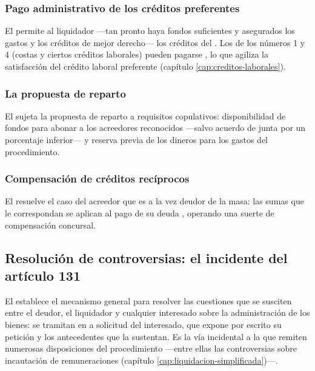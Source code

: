 \subsubsection{Pago administrativo de los créditos preferentes}

El  permite al liquidador  ---tan pronto haya
fondos suficientes y asegurados los gastos y los créditos de mejor derecho--- los créditos del
. Los de los números 1 y 4 (costas y ciertos créditos laborales) pueden pagarse
, lo que agiliza la satisfacción del crédito laboral
preferente (capítulo \ref{cap:creditos-laborales}).

\subsubsection{La propuesta de reparto}

El  sujeta la propuesta de reparto a requisitos copulativos: disponibilidad de fondos
para abonar a los acreedores reconocidos  ---salvo
acuerdo de junta por un porcentaje inferior--- y reserva previa de los dineros para los gastos
del procedimiento.

\subsubsection{Compensación de créditos recíprocos}

El  resuelve el caso del acreedor que es a la vez deudor de la masa: las sumas que le
correspondan se aplican al pago de su deuda , operando una
suerte de compensación concursal.

\subsection{Resolución de controversias: el incidente del artículo 131}

El  establece el mecanismo general para resolver las cuestiones que se susciten entre el
deudor, el liquidador y cualquier interesado sobre la administración de los bienes: se tramitan
en  a solicitud del interesado, que expone por escrito su petición
y los antecedentes que la sustentan. Es la vía incidental a la que remiten numerosas
disposiciones del procedimiento ---entre ellas las controversias sobre incautación de
remuneraciones (capítulo \ref{cap:liquidacion-simplificada})---.

